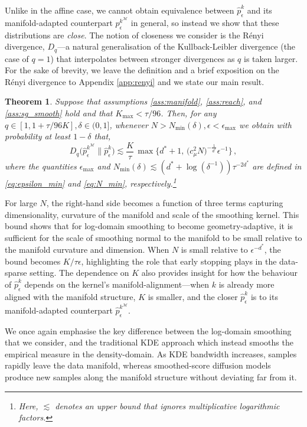 \documentclass[10pt]{article}
\theoremstyle{plain}
\newtheorem{theorem}{Theorem}[section]
\theoremstyle{definition}
\theoremstyle{remark}
\newcommand{\M}{{\mathcal{M}}}
\begin{document}
Unlike in the affine case, we cannot obtain equivalence between \(\hat{p}^k_\epsilon\) and its manifold-adapted counterpart \(p_\epsilon^{k^\M}\) in general, so instead we show that these distributions are \emph{close}. The notion of closeness we consider is the R\'enyi divergence, \(D_q\)---a natural generalisation of the Kullback-Leibler divergence (the case of \(q = 1\)) that interpolates between stronger divergences as \(q\) is taken larger. For the sake of brevity, we leave the definition and a brief exposition on the R\'enyi divergence to Appendix \ref{app:renyi} and we state our main result.

\begin{theorem}\label{thm:density_ratio_bound_simplified}
Suppose that assumptions \ref{ass:manifold}, \ref{ass:reach}, and \ref{ass:sg_smooth} hold and that \(K_{\max} < \tau/96\). Then, for any \(q \in [1, 1+\tau/96K], \delta \in (0, 1]\), whenever \(N > N_{\min}(\delta), \epsilon < \epsilon_{\max}\) we obtain with probability at least \(1 - \delta\) that,
\begin{equation*}
    D_q \big ( \hat{p}_\epsilon^{k^\M} \big \| \hat{p}_\epsilon^k \big ) \lesssim \frac{K}{\tau} \, \max \Big \{ d^* + 1, \, \big ( c_\mu^2 N \big )^{-\frac{1}{d^*}} \epsilon^{-1} \Big \}\,,
\end{equation*}
where the quantities \(\epsilon_{\max}\) and \(N_{\min}(\delta) \lesssim (d^* + \log(\delta^{-1})) \tau^{-2d^*}\) are defined in \eqref{eq:epsilon_min} and \eqref{eq:N_min}, respectively.\footnote{Here, \(\lesssim\) denotes an upper bound that ignores multiplicative logarithmic factors.}
\end{theorem}
For large \(N\), the right-hand side becomes a function of three terms capturing dimensionality, curvature of the manifold and scale of the smoothing kernel. This bound shows that for log-domain smoothing to become geometry-adaptive, it is sufficient for the scale of smoothing normal to the manifold to be small relative to the manifold curvature and dimension. When \(N\) is small relative to \(\epsilon^{-d^*}\), the bound becomes \(K/\tau \epsilon\), highlighting the role that early stopping plays in the data-sparse setting. The dependence on $K$ also provides insight for how the behaviour of $\hat{p}_\epsilon^k$ depends on the kernel's manifold-alignment---when $k$ is already more aligned with the manifold structure, $K$ is smaller, and the closer $\hat{p}_\epsilon^k$ is to its manifold-adapted counterpart $\hat{p}_\epsilon^{k^\mathcal{M}}$.

We once again emphasise the key difference between the log-domain smoothing that we consider, and the traditional KDE approach which instead smooths the empirical measure in the density-domain. As KDE bandwidth increases, samples rapidly leave the data manifold, whereas smoothed-score diffusion models produce new samples along the manifold structure without deviating far from it.
\end{document}

